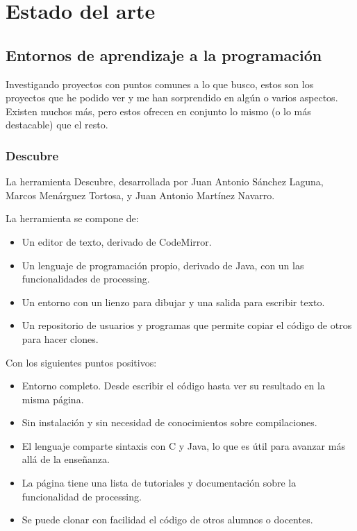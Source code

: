 \documentclass{report}
\begin{document}
	\chapter{Estado del arte}
	
	\section{Entornos de aprendizaje a la programación}
	
	Investigando proyectos con puntos comunes a lo que busco, estos son los proyectos que he podido ver y me han sorprendido en algún o varios aspectos. Existen muchos más, pero estos ofrecen en conjunto lo mismo (o lo más destacable) que el resto.
	
	\subsection{Descubre}
	
	La herramienta Descubre, desarrollada por Juan Antonio Sánchez Laguna, Marcos Menárguez Tortosa, y Juan Antonio Martínez Navarro. 
	
	La herramienta se compone de:
	
	
	\begin{itemize}
		\item Un editor de texto, derivado de CodeMirror.
		\item Un lenguaje de programación propio, derivado de Java, con un las funcionalidades de processing.
		\item Un entorno con un lienzo para dibujar y una salida para escribir texto.
		\item Un repositorio de usuarios y programas que permite copiar el código de otros para hacer clones. 
	\end{itemize}
	
	Con los siguientes puntos positivos:
	
	\begin{itemize}
		\item Entorno completo. Desde escribir el código hasta ver su resultado en la misma página.
		\item Sin instalación y sin necesidad de conocimientos sobre compilaciones.
		\item El lenguaje comparte sintaxis con C y Java, lo que es útil para avanzar más allá de la enseñanza. 
		\item La página tiene una lista de tutoriales y documentación sobre la funcionalidad de processing.
		\item Se puede clonar con facilidad el código de otros alumnos o docentes.
	\end{itemize}
	
\end{document}
